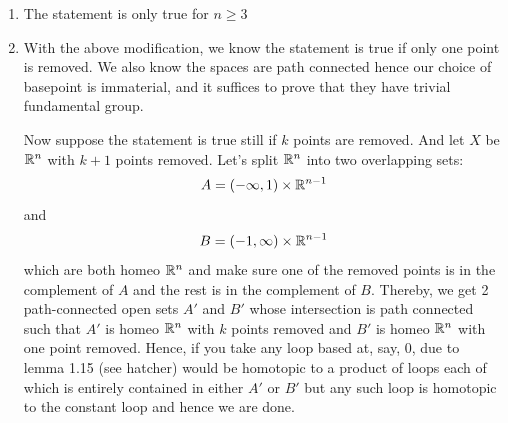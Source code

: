 \documentclass{article}
\begin{document}
\maketitle

\pagebreak 

\begin{homeworkProblem}
    \begin{enumerate}
        \item The statement is only true for $n \geq 3$
        \item With the above modification, we know the statement is true if only one point is removed. We also know the spaces are path connected hence our choice of basepoint is immaterial, and it suffices to prove that they have trivial fundamental group.
        
        Now suppose the statement is true still if $k$ points are removed. And let $X$ be $\mathbb{R}^n$ with $k+1$ points removed. Let's split $\mathbb{R}^n$ into two overlapping sets:
        \[A = (-\infty, 1)\times\mathbb{R}^{n-1}\]
        and
        \[B = (-1, \infty)\times\mathbb{R}^{n-1}\]
        which are both homeo $\mathbb{R}^n$ and make sure one of the removed points is in the complement of $A$ and the rest is in the complement of $B$. Thereby, we get 2 path-connected open sets $A'$ and $B'$ whose intersection is path connected such that $A'$ is homeo $\mathbb{R}^n$ with $k$ points removed and $B'$ is homeo $\mathbb{R}^n$ with one point removed. Hence, if you take any loop based at, say, $0$, due to lemma 1.15 (see hatcher) would be homotopic to a product of loops each of which is entirely contained in either $A'$ or $B'$ but any such loop is homotopic to the constant loop and hence we are done.
    \end{enumerate}
\end{homeworkProblem}
\end{document}
